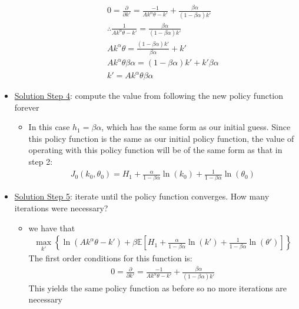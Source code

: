 \documentclass{article}
\begin{document}
\begin{itemize}
\begin{itemize}
\begin{gather*}
            0 = \tfrac{\partial}{\partial k'} = \frac{-1}{Ak^{\alpha}\theta - k'} + \frac{\beta \alpha}{(1-\beta \alpha)k'} \\
            \therefore \frac{1}{Ak^{\alpha}\theta - k'} = \frac{\beta \alpha}{(1-\beta \alpha)k'} \\
            Ak^{\alpha} \theta = \frac{(1-\beta \alpha)k'}{\beta \alpha} + k' \\
            A k^{\alpha} \theta \beta \alpha = (1 - \beta \alpha) k' + k'\beta \alpha \\
            k' = Ak^{\alpha} \theta \beta \alpha
        \end{gather*}
    \end{itemize}
    \item  \underline{Solution Step 4}: compute the value from following the new policy function forever
    \begin{itemize}
        \item In this case $h_{1} = \beta \alpha$, which has the same form as our initial guess. Since this policy function is the same as our initial policy function, the value of operating with this policy function will be of the same form as that in step 2:
        \begin{gather*}
            J_{0}(k_{0},\theta_{0}) = H_{1} + \tfrac{\alpha}{1 - \beta \alpha}\ln(k_{0}) + \tfrac{1}{1 - \beta \alpha} \ln (\theta_{0})
        \end{gather*}
    \end{itemize}
    \item  \underline{Solution Step 5}: iterate until the policy function converges. How many iterations were necessary?
    \begin{itemize}
        \item we have that
        \begin{gather*}
            \max_{k'} \left\{ \ln (Ak^{\alpha}\theta - k') + \beta \mathbb{E} [H_{1} + \tfrac{\alpha}{1 - \beta \alpha}\ln(k') + \tfrac{1}{1 - \beta \alpha} \ln (\theta')] \right\}
        \end{gather*}
        The first order conditions for this function is:
        \begin{gather*}
            0 = \tfrac{\partial}{\partial k'} = \frac{-1}{Ak^{\alpha}\theta - k'} + \frac{\beta \alpha}{(1-\beta \alpha)k'}
        \end{gather*}
        This yields the same policy function as before so no more iterations are necessary
    \end{itemize}

\end{itemize}
\end{document}

